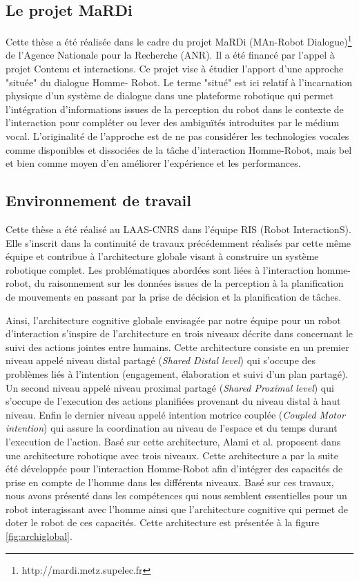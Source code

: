 \documentclass[a4paper,11pt,twoside]{StyleThese}
\begin{document}
\subsection{Le projet MaRDi}
Cette thèse a été réalisée dans le cadre du projet MaRDi (MAn-Robot Dialogue)\footnote{http://mardi.metz.supelec.fr} de l’Agence Nationale pour la Recherche (ANR). Il a été financé par l’appel à projet Contenu et interactions.
Ce projet vise à étudier l’apport d’une approche "située" du dialogue Homme-
Robot. Le terme "situé" est ici relatif à l’incarnation physique d’un système de dialogue dans une plateforme robotique qui permet l’intégration d’informations issues de la perception du robot dans le contexte de l’interaction pour compléter ou lever des ambiguïtés introduites par le médium vocal. L’originalité de l’approche est de ne pas considérer les technologies vocales comme disponibles et dissociées de la tâche d’interaction Homme-Robot, mais bel et bien comme moyen d’en améliorer l’expérience et les performances.

\subsection{Environnement de travail}
\label{sec:workEnv}
Cette thèse a été réalisé au LAAS-CNRS dans l'équipe RIS (Robot InteractionS).
Elle s'inscrit dans la continuité de travaux précédemment réalisés par cette même équipe et contribue à l'architecture globale visant à construire un système robotique complet. Les problématiques abordées sont liées à l'interaction homme-robot, du raisonnement sur les données issues de la perception à la planification de mouvements en passant par la prise de décision et la planification de tâches.

Ainsi, l'architecture cognitive globale envisagée par notre équipe pour un robot d'interaction s'inspire de l'architecture en trois niveaux décrite dans \cite{pacherie2012phenomenology} concernant le suivi des actions jointes entre humains. Cette architecture consiste en un premier niveau appelé niveau distal partagé (\textit{Shared Distal level}) qui s'occupe des problèmes liés à l'intention (engagement, élaboration et suivi d'un plan partagé). Un second niveau appelé niveau proximal partagé (\textit{Shared Proximal level}) qui s'occupe de l'execution des actions planifiées provenant du niveau distal à haut niveau. Enfin le dernier niveau appelé  intention motrice couplée (\textit{Coupled Motor intention}) qui assure la coordination au niveau de l'espace et du temps durant l'execution de l'action.
Basé sur cette architecture, Alami et al. proposent dans \cite{alami1998architecture} une architecture robotique avec trois niveaux. Cette architecture a par la suite été développée pour l'interaction Homme-Robot \cite{alami2011robot,alami2013human,fioreiser2014} afin d'intégrer des capacités de prise en compte de l'homme dans les différents niveaux. 
Basé sur ces travaux, nous avons présenté dans \cite{Devin16} les compétences qui nous semblent essentielles pour un robot interagissant avec l'homme ainsi que l'architecture cognitive qui permet de doter le robot de ces capacités.
Cette architecture est présentée à la figure \ref{fig:archiglobal}.
\end{document}
